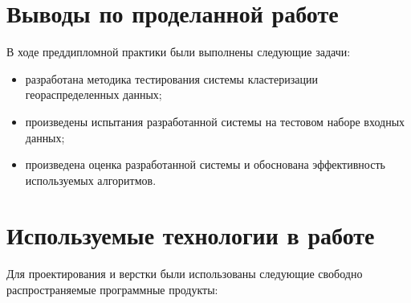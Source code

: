\documentclass[a4paper, 14pt]{extreport}
\begin{document}
    \chapter{Выводы по проделанной работе}
    В ходе преддипломной практики были выполнены следующие задачи:
    \begin{itemize}
        \item разработана методика тестирования системы кластеризации геораспределенных данных;
        \item произведены испытания разработанной системы на тестовом наборе входных данных;
        \item произведена оценка разработанной системы и обоснована эффективность 
                используемых алгоритмов.
    \end{itemize}

    \chapter{Используемые технологии в работе}
    Для проектирования и верстки были использованы следующие свободно распространяемые программные 
    продукты:
\end{document}
